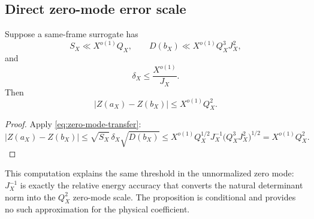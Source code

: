 \subsection{Direct zero-mode error scale}

\begin{proposition}
\label{prop:direct-zero-mode-scale}
Suppose a same-frame surrogate has
\[
 S_X\ll X^{o(1)}Q_X,\qquad
 D(b_X)\ll X^{o(1)}Q_X^3J_X^2,
\]
and
\[
 \delta_X\le\frac{X^{o(1)}}{J_X}.
\]
Then
\begin{equation}
 |Z(a_X)-Z(b_X)|
 \le X^{o(1)}Q_X^2.
\label{eq:direct-zero-mode-scale}
\end{equation}
\end{proposition}

\begin{proof}
Apply \eqref{eq:zero-mode-transfer}:
\[
 |Z(a_X)-Z(b_X)|
 \le
 \sqrt{S_X}\,\delta_X\sqrt{D(b_X)}
 \le
 X^{o(1)}
 Q_X^{1/2}J_X^{-1}
 \bigl(Q_X^3J_X^2\bigr)^{1/2}
 =
 X^{o(1)}Q_X^2.
\]
\end{proof}

\begin{remark}
This computation explains the same threshold in the unnormalized
zero mode: \(J_X^{-1}\) is exactly the relative energy accuracy
that converts the natural determinant norm into the \(Q_X^2\)
zero-mode scale.  The proposition is conditional and provides no
such approximation for the physical coefficient.
\end{remark}
